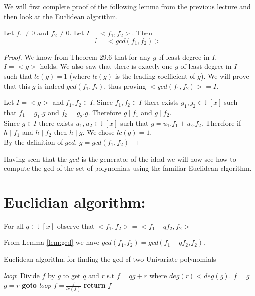 We will first complete proof of the following lemma from the previous lecture and then look at the Euclidean algorithm.

\begin{lemma}
\label{lem:gcd}
Let $f_1 \neq 0$ and $f_2\neq 0$. Let $I = <f_1, f_2>$. Then
$$I=<gcd(f_1,f_2)>$$
\end{lemma}
\begin{proof}
We know from Theorem 29.6 that for any $g$ of least degree in $I$, $I=<g>$ holds. We also saw that there is exactly one $g$ of least degree in $I$ such that $lc(g)=1$ (where $lc(g)$ is the leading coefficient of $g$). We will prove that this $g$ is indeed $gcd(f_{1},f_{2})$, thus proving $<gcd(f_{1},f_{2})>=I$.

Let $I=<g>$ and $f_{1},f_{2}\in I$. Since $f_{1},f_{2}\in I$ there exists $g_{1},g_{2}\in \mathbb{F}[x]$ such that $f_{1}=g_{1}.g$ and $f_{2}=g_{2}.g$. Therefore $g\mid f_{1}$ and $g\mid f_{2}$. \\

Since $g\in I$ there exists $u_{1},u_{2}\in \mathbb{F}[x]$ such that $g=u_{1}.f_{1}+u_{2}.f_{2}$. Therefore if $h\mid f_{1}$ and 
$h\mid f_{2}$ then $h\mid g$. We chose $lc(g)=1$.\\
By the definition of $gcd$, $g=gcd(f_{1},f_{2})$
\end{proof}

Having seen that the $gcd$ is the generator of the ideal we will now see how to compute the gcd of the set of polynomials using the familiar Euclidean algorithm.


\section*{Euclidian algorithm:}
\begin{observation}
For all $q\in \mathbb{F}[x]$ observe that
$<f_{1},f_{2}>=<f_{1}-qf_{2},f_{2}>$
\end{observation}

From Lemma \ref{lem:gcd} we have $gcd(f_{1},f_{2})=gcd(f_{1}-qf_{2},f_{2})$.


\begin{algorithm}
\caption{Euclidean algorithm for finding the gcd of two Univariate polynomials}
\label{alg:euclid}
\begin{algorithmic}[1]
\State \emph{loop}:
\State Divide $f$ by $g$ to get $q$ and $r$ s.t $f=qg+r$ where $deg(r)< deg(g)$.
\State $f=g$
\State $g=r$
\State \textbf{goto} \emph{loop}
\EndIf
\State $f=\frac{f}{lc(f)}$
\State \textbf{return} $f$
\EndProcedure
\end{algorithmic}
\end{algorithm}



